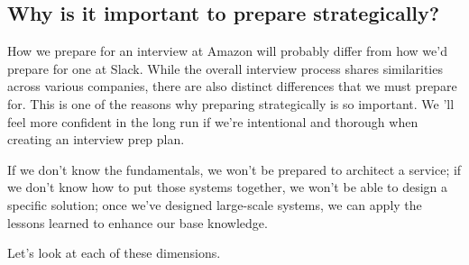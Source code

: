 \subsection{Why is it important to prepare strategically?}\label{c7fQXsCm-3QaDyPNyBa8p}

How we prepare for an interview at Amazon will probably differ from how we'd prepare for one at Slack. While the overall interview process shares similarities across various companies, there are also distinct differences that we must prepare for. This is one of the reasons why preparing strategically is so important. We 'll feel more confident in the long run if we're intentional and thorough when creating an interview prep plan.

If we don't know the fundamentals, we won't be prepared to architect a service; if we don't know how to put those systems together, we won't be able to design a specific solution; once we've designed large-scale systems, we can apply the lessons learned to enhance our base knowledge.

Let's look at each of these dimensions.

